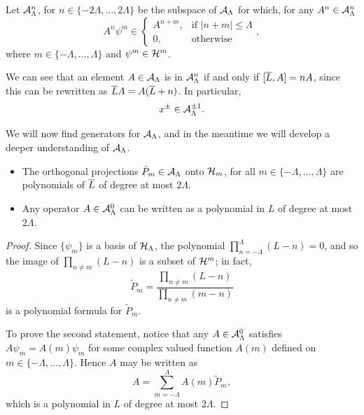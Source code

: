 \begin{definition}\label{definitionGradingOperatorsD2Cut}
Let $\mathcal A^n_\Lambda$, for $n \in \{-2\Lambda, \dots, 2\Lambda\}$ be the subspace of $\mathcal A_\Lambda$ for which, for any $A^n \in \mathcal A^n_\Lambda$
\begin{equation*}
    A^n \psi^m \in 
    \begin{cases}
        A^{n+m},& \text{if } |n+m| \leq \Lambda\\
        0, & \text{otherwise}
    \end{cases},
\end{equation*}
where $m \in \{-\Lambda, \dots, \Lambda\}$ and $\psi^m \in \mathcal H^m$.
\end{definition}

We can see that an element $A \in \mathcal A_\Lambda$ is in $\mathcal A^n_\Lambda$ if and only if $[\overline{L}, A] = nA$, since this can be rewritten as $\overline{L} A = A(\overline{L} + n)$. In particular, 
\begin{equation}\label{equationXPMGradeUpDownD2}
    x^\pm \in \mathcal A^{\pm 1}_\Lambda.
\end{equation}

\lin

We will now find generators for $\mathcal A_\Lambda$, and in the meantime we will develop a deeper understanding of $\mathcal A_\Lambda$.

\begin{proposition}\label{propositionAboutLProjectorsGeneralFunctionD2}
\hfill
    \begin{itemize}
    
    \item The orthogonal projections $\tilde P_m \in \mathcal A_\Lambda$ onto $\mathcal H_m$, for all $m \in \{-\Lambda, \dots, \Lambda\}$ are polynomials of $\overline{L}$ of degree at most $2 \Lambda$.
    
    \item Any operator $A \in \mathcal A^0_\Lambda$ can be written as a polynomial in $L$ of degree at most $2\Lambda$.
    
    \end{itemize}
\end{proposition}
\begin{proof}
Since $\{\psi_m\}$ is a basis of $\mathcal H_\Lambda$, the polynomial $\prod_{n = -\Lambda}^\Lambda (L - n) = 0$, and so the image of $\prod_{n \neq m} (L - n)$ is a subset of $\mathcal H^m$; in fact,
\begin{equation}\label{equationFormulaProjectionTildemD2}
    \tilde P_m = \frac{\prod_{n \neq m} (L - n)}{\prod_{n \neq m} (m - n)}
\end{equation}
is a polynomial formula for $\tilde P_m$.

To prove the second statement, notice that any $A \in \mathcal A^0_\Lambda$ satisfies $A \psi_m = A(m) \psi_m$ for some complex valued function $A(m)$ defined on $m \in \{-\Lambda, \dots, \Lambda\}$. Hence $A$ may be written as 
\begin{equation}
    A = \sum_{m = -\Lambda}^\Lambda A(m) \tilde P_m,
\end{equation} 
which is a polynomial in $L$ of degree at most $2\Lambda$.
\end{proof}

